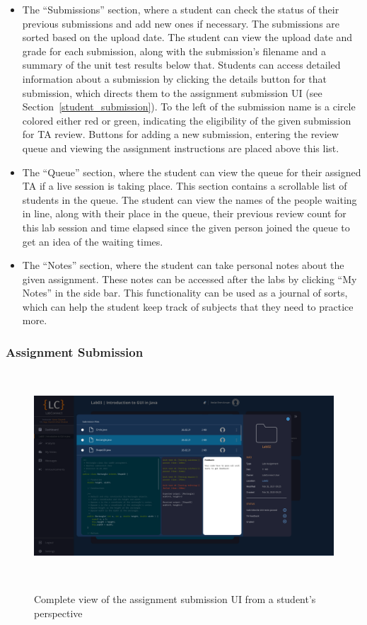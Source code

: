\documentclass[a4paper, 12pt]{article}
\begin{document}
    \begin{itemize}
      \item The ``Submissions'' section, where a student can check the status of their previous submissions and add new ones if necessary.
            The submissions are sorted based on the upload date. The student can view the upload date and grade for each submission,
            along with the submission's filename and a summary of the unit test results below that. Students can access detailed
            information about a submission by clicking the details button for that submission, which directs them to the
            assignment submission UI (see Section~\ref{student_submission}). To the left of the submission name is a circle colored either red or
            green, indicating the eligibility of the given submission for TA review. Buttons for adding a new submission, entering the
            review queue and viewing the assignment instructions are placed above this list.
      \item The ``Queue'' section, where the student can view the queue for their assigned TA if a live session is taking place. This section
            contains a scrollable list of students in the queue. The student can view the names of the people waiting in line, along with their
            place in the queue, their previous review count for this lab session and time elapsed since the given person joined the queue to get an idea
            of the waiting times.
      \item The ``Notes'' section, where the student can take personal notes about the given assignment. These notes can be accessed
            after the labs by clicking ``My Notes'' in the side bar. This functionality can be used as a journal of sorts, which can
            help the student keep track of subjects that they need to practice more.
    \end{itemize}

    \subsubsection{Assignment Submission}~\label{student_submission}

    \begin{figure}[H]
        \centering
        \includegraphics[width=\textwidth]{student_assignment_submission}
        \caption{Complete view of the assignment submission UI from a student's perspective}~\label{fig:student_assignment_submission_full}
    \end{figure}
\end{document}
